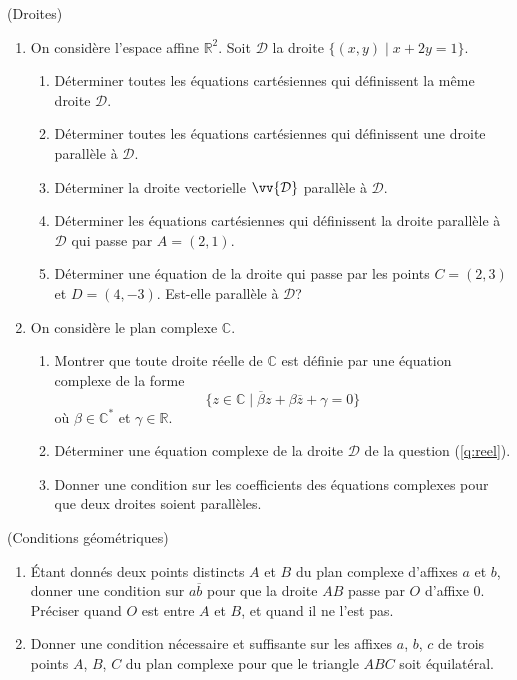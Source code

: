 \documentclass[a4paper,12pt,reqno]{amsart}
\begin{document}

\begin{exo} (Droites)

  \begin{enumerate}
    \item\label{q:reel} On considère l'espace affine $\mathbb{R}^{2}$. Soit $\mathcal{D}$ la droite $\big\{(x,y) \;\big|\; x+2y=1\big\}$.
    \begin{enumerate}
      \item Déterminer toutes les équations cartésiennes qui définissent la même droite $\mathcal{D}$.
      \item Déterminer toutes les équations cartésiennes qui définissent une droite parallèle à $\mathcal{D}$.
      \item Déterminer la droite vectorielle $\vv{\mathcal{D}}$ parallèle à $\mathcal{D}$.
      \item Déterminer les équations cartésiennes qui définissent la droite parallèle à $\mathcal{D}$ qui passe par $A=(2,1)$.
      \item Déterminer une équation de la droite qui passe par les points $C=(2,3)$ et $D=(4,-3)$. Est-elle parallèle à $\mathcal{D}$?
    \end{enumerate}
    \item On considère le plan complexe $\mathbb{C}$.
    \begin{enumerate}
      \item Montrer que toute droite réelle de $\mathbb{C}$ est définie par une équation complexe de la forme
        \[
          \big\{z \in \mathbb{C} \;\big|\; \overline{\beta}z+\beta\overline{z}+\gamma=0\big\}
        \]
        où $\beta \in \mathbb{C}^{*}$ et $\gamma \in \mathbb{R}$.
      \item Déterminer une équation complexe de la droite $\mathcal{D}$ de la question (\ref{q:reel}).
      \item Donner une condition sur les coefficients des équations complexes pour que deux droites soient parallèles.
    \end{enumerate}
  \end{enumerate}
\end{exo}

\begin{exo} (Conditions géométriques)
  \begin{enumerate}
    \item Étant donnés deux points distincts $A$ et $B$ du plan complexe d'affixes $a$ et $b$, donner une condition sur $a\overline{b}$ pour que la droite $AB$ passe par $O$ d'affixe $0$. Préciser quand $O$ est entre $A$ et $B$, et quand il ne l'est pas.

    \item Donner une condition nécessaire et suffisante sur les affixes $a$, $b$, $c$ de trois points $A$, $B$, $C$ du plan complexe pour que le triangle $ABC$ soit équilatéral.
  \end{enumerate}
\end{exo}
\end{document}
